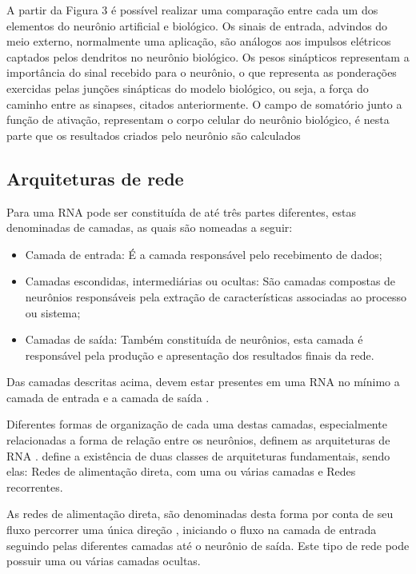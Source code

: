 A partir da Figura 3 é possível realizar uma comparação entre cada um dos elementos do neurônio artificial e biológico. Os sinais de entrada, advindos do meio externo, normalmente uma aplicação, são análogos aos impulsos elétricos captados pelos dendritos no neurônio biológico.  Os pesos sinápticos representam a importância do sinal recebido para o neurônio, o que representa as ponderações exercidas pelas junções sinápticas do modelo biológico, ou seja, a força do caminho entre as sinapses, citados anteriormente. O campo de somatório junto a função de ativação, representam o corpo celular do neurônio biológico, é nesta parte que os resultados criados pelo neurônio são calculados \cite{livroNunes2016} 

\subsection{Arquiteturas de rede} 

Para  uma RNA pode ser constituída de até três partes diferentes, estas denominadas de camadas, as quais são nomeadas a seguir:

\begin{itemize}
    \item Camada de entrada: É a camada responsável pelo recebimento de dados;
    \item Camadas escondidas, intermediárias ou ocultas: São camadas compostas de neurônios responsáveis pela extração de características associadas ao processo ou sistema;
    \item Camadas de saída: Também constituída de neurônios, esta camada é responsável pela produção e apresentação dos resultados finais da rede.
\end{itemize}

Das camadas descritas acima, devem estar presentes em uma RNA no mínimo a camada de entrada e a camada de saída \cite{Cintra2019}.

Diferentes formas de organização de cada uma destas camadas, especialmente relacionadas a forma de relação entre os neurônios, definem as arquiteturas de RNA \cite{livroNunes2016}.  define a existência de duas classes de arquiteturas fundamentais, sendo elas: Redes de alimentação direta, com uma ou várias camadas e Redes recorrentes.

As redes de alimentação direta, são denominadas desta forma por conta de seu fluxo percorrer uma única direção \cite{Cintra2019}, iniciando o fluxo na camada de entrada seguindo pelas diferentes camadas até o neurônio de saída. Este tipo de rede pode possuir uma ou várias camadas ocultas.

